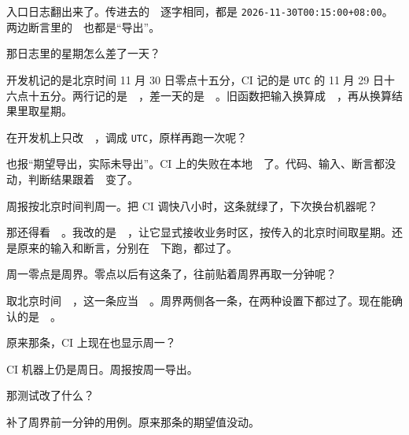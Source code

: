 \documentclass[UTF8, zihao=5, a4paper, fontset=fandol]{ctexart}
\begin{document}
\noindent\arole 入口日志翻出来了。传进去的~~逐字相同，都是 \texttt{2026-11-30T00:15:00+08:00}。两边断言里的~~也都是“导出”。

\noindent\urole 那日志里的星期怎么差了一天？

\noindent\arole 开发机记的是北京时间 11 月 30 日零点十五分，CI 记的是 \texttt{UTC} 的 11 月 29 日十六点十五分。两行记的是~~，差一天的是~~。旧函数把输入换算成~~，再从换算结果里取星期。

\noindent\urole 在开发机上只改~~，调成 \texttt{UTC}，原样再跑一次呢？

\noindent\arole 也报“期望导出，实际未导出”。CI 上的失败在本地~~了。代码、输入、断言都没动，判断结果跟着~~变了。

\noindent\urole 周报按北京时间判周一。把 CI 调快八小时，这条就绿了，下次换台机器呢？

\noindent\arole 那还得看~~。我改的是~~，让它显式接收业务时区，按传入的北京时间取星期。还是原来的输入和断言，分别在~~下跑，都过了。

\noindent\urole 周一零点是周界。零点以后有这条了，往前贴着周界再取一分钟呢？

\noindent\arole 取北京时间~~，这一条应当~~。周界两侧各一条，在两种设置下都过了。现在能确认的是~~。

\noindent\urole 原来那条，CI 上现在也显示周一？

\noindent\arole CI 机器上仍是周日。周报按周一导出。

\noindent\urole 那测试改了什么？

\noindent\arole 补了周界前一分钟的用例。原来那条的期望值没动。

\medskip
{}
\end{document}
